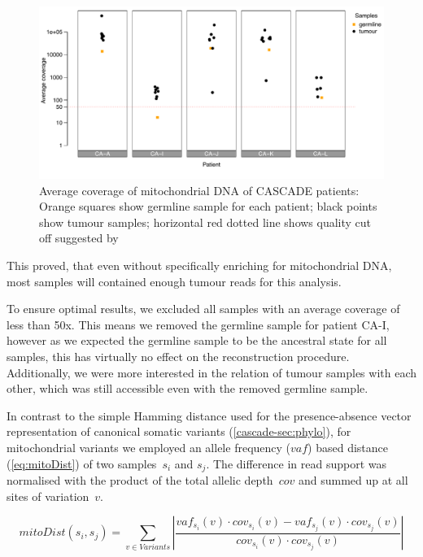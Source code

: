 \begin{figure}[!ht]
\centering
\includegraphics[width=.99\linewidth]{Figures/CASCADE/mito/mtCoverage}
\vspace{-1em}
\caption[Average coverage of mitochondrial DNA of CASCADE patients]{Average coverage of mitochondrial DNA of CASCADE patients: Orange squares show germline sample for each patient; black points show tumour samples; horizontal red dotted line shows quality cut off suggested by \protect\textcite{Ludwig2019}} \label{fig:mtCoverage}
\end{figure}

This proved, that even without specifically enriching for mitochondrial DNA, most samples will contained enough tumour reads for this analysis.

To ensure optimal results, we excluded all samples with an average coverage of less than 50x. This means we removed the germline sample for patient CA-I, however as we expected the germline sample to be the ancestral state for all samples, this has virtually no effect on the reconstruction procedure. Additionally, we were more interested in the relation of tumour samples with each other, which was still accessible even with the removed germline sample.

In contrast to the simple Hamming distance used for the presence-absence vector representation of canonical somatic variants (\autoref{cascade-sec:phylo}), for mitochondrial variants we employed an allele frequency ($vaf$) based distance (\autoref{eq:mitoDist}) of two samples~$s_i$ and $s_j$. The difference in read support was normalised with the product of the total allelic depth~$cov$ and summed up at all sites of variation~$v$.

\begin{equation}
mitoDist(s_i,s_j) = \sum_{v \in Variants} \left| \frac{vaf_{s_i}(v) \cdot cov_{s_i}(v) - vaf_{s_j}(v) \cdot cov_{s_j}(v)}{cov_{s_i}(v) \cdot cov_{s_j}(v)} \right| \label{eq:mitoDist}
\end{equation}
\myequation[\ref{eq:mitoDist}]{Mitochondrial variants based distance function of two samples}

